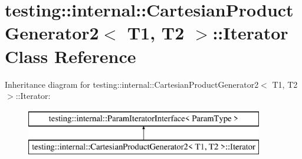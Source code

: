\hypertarget{classtesting_1_1internal_1_1_cartesian_product_generator2_1_1_iterator}{}\section{testing\+:\+:internal\+:\+:Cartesian\+Product\+Generator2$<$ T1, T2 $>$\+:\+:Iterator Class Reference}
\label{classtesting_1_1internal_1_1_cartesian_product_generator2_1_1_iterator}
Inheritance diagram for testing\+:\+:internal\+:\+:Cartesian\+Product\+Generator2$<$ T1, T2 $>$\+:\+:Iterator\+:\begin{figure}[H]
\begin{center}
\leavevmode
\includegraphics[height=2.000000cm]{classtesting_1_1internal_1_1_cartesian_product_generator2_1_1_iterator}
\end{center}
\end{figure}
